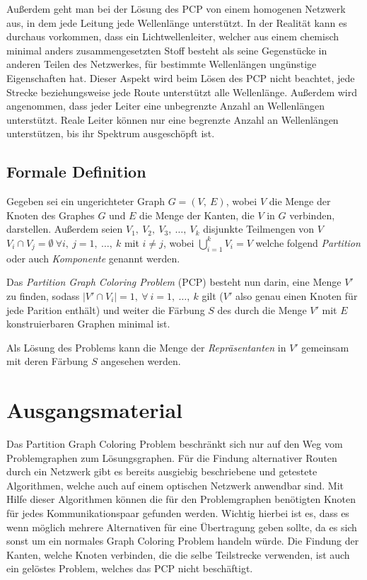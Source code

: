 Außerdem geht man bei der Lösung des PCP von einem homogenen Netzwerk aus, in dem jede Leitung jede Wellenlänge unterstützt. In der Realität kann es durchaus vorkommen, dass ein
Lichtwellenleiter, welcher aus einem chemisch minimal anders zusammengesetzten Stoff besteht als seine Gegenstücke in anderen Teilen des Netzwerkes, für bestimmte Wellenlängen
ungünstige Eigenschaften hat. Dieser Aspekt wird beim Lösen des PCP nicht beachtet, jede Strecke beziehungsweise jede Route unterstützt alle Wellenlänge. Außerdem wird angenommen, 
dass jeder Leiter eine unbegrenzte Anzahl an Wellenlängen unterstützt. Reale Leiter können nur eine begrenzte Anzahl an Wellenlängen unterstützen, bis ihr Spektrum ausgeschöpft ist.

\subsection{Formale Definition}

Gegeben sei ein ungerichteter Graph $G = (V,\ E)$, wobei $V$ die Menge der Knoten des Graphes $G$ und $E$ die Menge der Kanten, die $V$ in $G$ verbinden, darstellen. Außerdem seien $V_1,\ V_2,\ V_3,\ \ldots,\ V_k$ disjunkte Teilmengen von $V$ $V_i \cap V_j = \emptyset \ \forall i,\ j = 1,\ \ldots,\ k$ mit $i \not = j$, wobei $\bigcup_{i = 1}^k V_i = V$ welche folgend \textit{Partition} oder auch \textit{Komponente} genannt werden.

Das \textit{Partition Graph Coloring Problem} (PCP) besteht nun darin, eine Menge $V'$ zu finden, sodass $|V' \cap V_i| = 1,\ \forall\ i = 1,\ \ldots,\ k$ gilt ($V'$ also genau einen Knoten für jede Parition enthält) und weiter die Färbung $S$ des durch die Menge $V'$ mit $E$ konstruierbaren Graphen minimal ist.

Als Lösung des Problems kann die Menge der \textit{Repräsentanten} in $V'$ gemeinsam mit deren Färbung $S$ angesehen werden.

\section{Ausgangsmaterial}
Das Partition Graph Coloring Problem beschränkt sich nur auf den Weg vom Problemgraphen zum Lösungsgraphen. Für die Findung alternativer Routen durch ein Netzwerk gibt es 
bereits ausgiebig beschriebene und getestete Algorithmen, welche auch auf einem optischen Netzwerk anwendbar sind. Mit Hilfe dieser Algorithmen können die für den
Problemgraphen benötigten Knoten für jedes Kommunikationspaar gefunden werden. Wichtig hierbei ist es, dass es wenn möglich mehrere Alternativen für eine Übertragung geben sollte,
da es sich sonst um ein normales Graph Coloring Problem handeln würde. Die Findung der Kanten, welche Knoten verbinden, die die selbe Teilstrecke verwenden, ist auch ein
gelöstes Problem, welches das PCP nicht beschäftigt.

